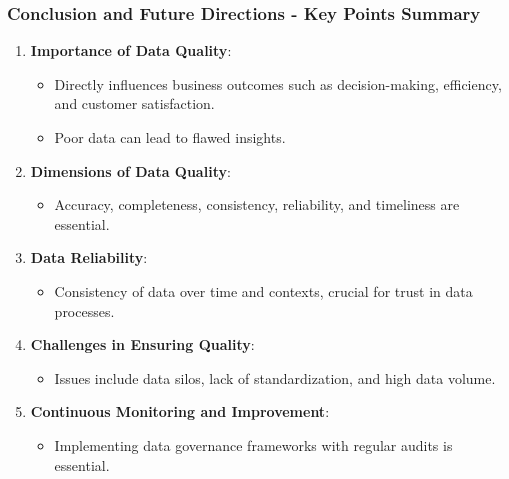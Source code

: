 \documentclass{beamer}
\begin{document}
\begin{frame}[fragile]
    \frametitle{Conclusion and Future Directions - Key Points Summary}
    \begin{enumerate}
        \item \textbf{Importance of Data Quality}:
        \begin{itemize}
            \item Directly influences business outcomes such as decision-making, efficiency, and customer satisfaction.
            \item Poor data can lead to flawed insights.
        \end{itemize}

        \item \textbf{Dimensions of Data Quality}:
        \begin{itemize}
            \item Accuracy, completeness, consistency, reliability, and timeliness are essential.
        \end{itemize}

        \item \textbf{Data Reliability}:
        \begin{itemize}
            \item Consistency of data over time and contexts, crucial for trust in data processes.
        \end{itemize}
        
        \item \textbf{Challenges in Ensuring Quality}:
        \begin{itemize}
            \item Issues include data silos, lack of standardization, and high data volume.
        \end{itemize}
        
        \item \textbf{Continuous Monitoring and Improvement}:
        \begin{itemize}
            \item Implementing data governance frameworks with regular audits is essential.
        \end{itemize}
    \end{enumerate}
\end{frame}
\end{document}
